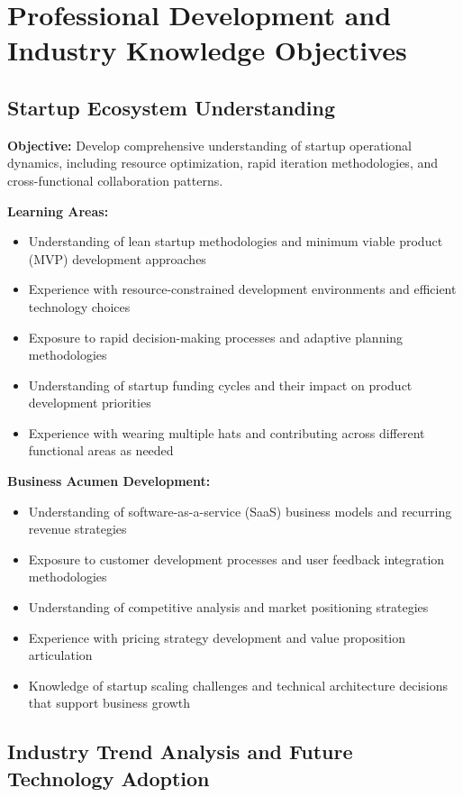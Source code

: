 \section{Professional Development and Industry Knowledge Objectives}

\subsection{Startup Ecosystem Understanding}

\textbf{Objective:} Develop comprehensive understanding of startup operational dynamics, including resource optimization, rapid iteration methodologies, and cross-functional collaboration patterns.

\textbf{Learning Areas:}
\begin{itemize}
    \item Understanding of lean startup methodologies and minimum viable product (MVP) development approaches
    \item Experience with resource-constrained development environments and efficient technology choices
    \item Exposure to rapid decision-making processes and adaptive planning methodologies
    \item Understanding of startup funding cycles and their impact on product development priorities
    \item Experience with wearing multiple hats and contributing across different functional areas as needed
\end{itemize}

\textbf{Business Acumen Development:}
\begin{itemize}
    \item Understanding of software-as-a-service (SaaS) business models and recurring revenue strategies
    \item Exposure to customer development processes and user feedback integration methodologies
    \item Understanding of competitive analysis and market positioning strategies
    \item Experience with pricing strategy development and value proposition articulation
    \item Knowledge of startup scaling challenges and technical architecture decisions that support business growth
\end{itemize}

\subsection{Industry Trend Analysis and Future Technology Adoption}

